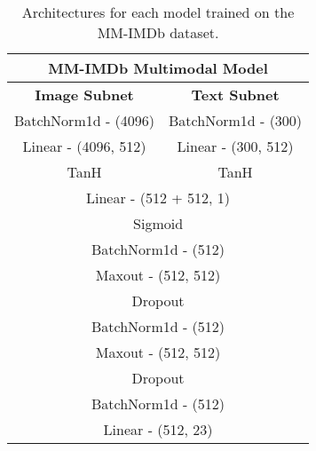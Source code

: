 \begin{table}[h!]
\footnotesize
    \caption{Architectures for each model trained on the MM-IMDb dataset.}    \centering
    \begin{minipage}[t]{0.49\textwidth}
    \centering
    \vspace{0pt} %
    \begin{tabular}{clllllclllll}
        \hline
        \multicolumn{12}{c}{\textbf{MM-IMDb Multimodal Model}}                                \\ \hline
        \multicolumn{6}{c|}{\textbf{Image Subnet}} & \multicolumn{6}{c}{\textbf{Text Subnet}} \\ \hline
        \multicolumn{6}{c|}{BatchNorm1d - (4096)}  & \multicolumn{6}{c}{BatchNorm1d - (300)}  \\ \hline
        \multicolumn{6}{c|}{Linear - (4096, 512)}  & \multicolumn{6}{c}{Linear - (300, 512)}  \\ \hline
        \multicolumn{6}{c|}{TanH}                  & \multicolumn{6}{c}{TanH}                 \\ \hline
        \multicolumn{12}{c}{Linear - (512 + 512, 1)}                                          \\ \hline
        \multicolumn{12}{c}{Sigmoid}                                                          \\ \hline
        \multicolumn{12}{c}{BatchNorm1d - (512)}                                              \\ \hline
        \multicolumn{12}{c}{Maxout - (512, 512)}                                              \\ \hline
        \multicolumn{12}{c}{Dropout}                                                  \\ \hline
        \multicolumn{12}{c}{BatchNorm1d - (512)}                                              \\ \hline
        \multicolumn{12}{c}{Maxout - (512, 512)}                                              \\ \hline
        \multicolumn{12}{c}{Dropout}                                                  \\ \hline
        \multicolumn{12}{c}{BatchNorm1d - (512)}                                              \\ \hline
        \multicolumn{12}{c}{Linear - (512, 23)}                                               \\ \hline
        \end{tabular}%


\end{minipage}
\end{table}
